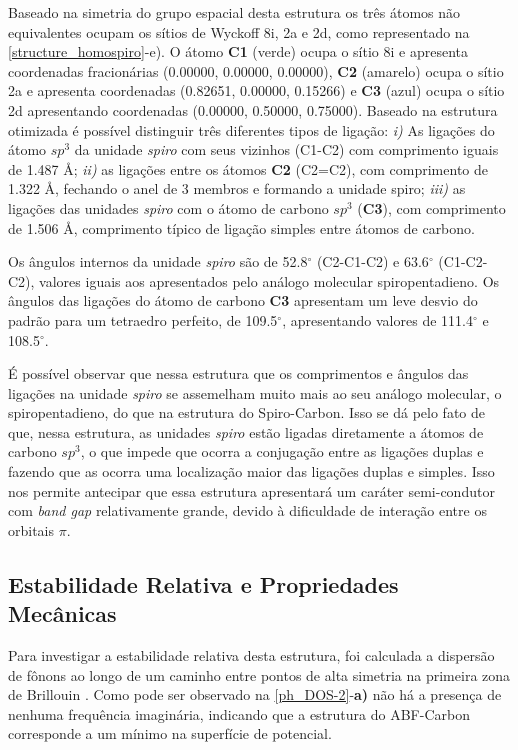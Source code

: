 		
		Baseado na simetria do grupo espacial desta estrutura os três átomos não equivalentes ocupam os sítios de Wyckoff 8i, 2a e 2d, como representado na \autoref{structure_homospiro}-e). O átomo \textbf{C1} (verde) ocupa o sítio 8i e apresenta coordenadas fracionárias (0.00000, 0.00000, 0.00000), \textbf{C2} (amarelo) ocupa o sítio 2a e apresenta coordenadas (0.82651, 0.00000, 0.15266) e \textbf{C3} (azul) ocupa o sítio 2d apresentando coordenadas (0.00000, 0.50000, 0.75000). Baseado na estrutura otimizada é possível distinguir três diferentes tipos de ligação: \textit{i)} As ligações do átomo $sp^3$ da unidade \textit{spiro} com seus vizinhos (C1-C2) com comprimento iguais de 1.487 \AA{}; \textit{ii)} as ligações entre os átomos \textbf{C2} (C2=C2), com comprimento de 1.322 \AA{}, fechando o anel de 3 membros e formando a unidade spiro; \textit{iii)} as ligações das unidades \textit{spiro} com o átomo de carbono $sp^3$ (\textbf{C3}), com comprimento de 1.506 \AA, comprimento típico de ligação simples entre átomos de carbono.
		
		Os ângulos internos da unidade \textit{spiro} são de 52.8$^\circ$ (C2-C1-C2) e 63.6$^\circ$ (C1-C2-C2), valores iguais aos apresentados pelo análogo molecular spiropentadieno. Os ângulos das ligações do átomo de carbono \textbf{C3} apresentam um leve desvio do padrão para um tetraedro perfeito, de 109.5$^\circ$, apresentando valores de 111.4$^\circ$ e 108.5$^\circ$.     
		
		É possível observar que nessa estrutura que os comprimentos e ângulos das ligações na unidade \textit{spiro} se assemelham muito mais ao seu análogo molecular, o spiropentadieno, do que na estrutura do Spiro-Carbon. Isso se dá pelo fato de que, nessa estrutura, as unidades \textit{spiro} estão ligadas diretamente a átomos de carbono $sp^3$, o que impede que ocorra a conjugação entre as ligações duplas e fazendo que as ocorra uma localização maior das ligações duplas e simples. Isso nos permite antecipar que essa estrutura apresentará um caráter semi-condutor com \textit{band gap} relativamente grande, devido à dificuldade de interação entre os orbitais $\pi$. 
		
	\subsection{Estabilidade Relativa e Propriedades Mecânicas}
	
		Para investigar a estabilidade relativa desta estrutura, foi calculada a dispersão de fônons ao longo de um caminho entre pontos de alta simetria na primeira zona de Brillouin \cite{bradley2010mathematical}. Como pode ser observado na \autoref{ph_DOS-2}-\textbf{a)} não há a presença de nenhuma frequência imaginária, indicando que a estrutura do ABF-Carbon corresponde a um mínimo na superfície de potencial. 
	
